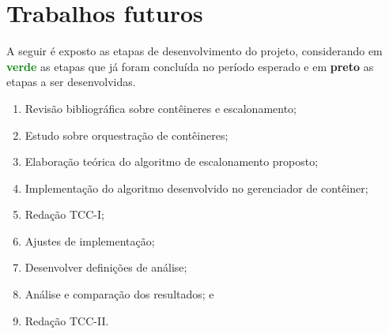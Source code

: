 \section{Trabalhos futuros}
\noindent
A seguir é exposto as etapas de desenvolvimento do projeto, considerando em \textbf{\textcolor{green}{verde}} as etapas que já foram concluída no período esperado e em \textbf{preto} as etapas a ser desenvolvidas. 

\begin{enumerate}
	\item Revisão bibliográfica sobre contêineres e escalonamento;
	\item Estudo sobre orquestração de contêineres;
	\item Elaboração teórica do algoritmo de escalonamento proposto;
	\item Implementação do algoritmo desenvolvido no gerenciador de contêiner;
	
	\item Redação TCC-I;
	\item Ajustes de implementação;
	\item Desenvolver definições de análise;
	\item Análise e comparação dos resultados; e
	\item Redação TCC-II.
\end{enumerate}

